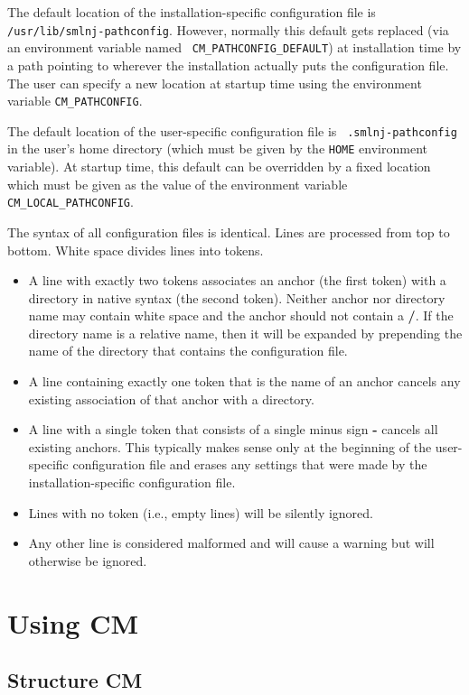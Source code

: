 \documentclass{article}
\begin{document}
The default location of the installation-specific configuration file
is {\tt /usr/lib/smlnj-pathconfig}.  However, normally this default
gets replaced (via an environment variable named {\tt
CM\_PATHCONFIG\_DEFAULT}) at installation time by a path pointing to
wherever the installation actually puts the configuration file.
The user can specify a new location at startup time using the
environment variable {\tt CM\_PATHCONFIG}.

The default location of the user-specific configuration file is {\tt
.smlnj-pathconfig} in the user's home directory (which must be given
by the {\tt HOME} environment variable).  At startup time, this
default can be overridden by a fixed location which must be given as
the value of the environment variable {\tt CM\_LOCAL\_PATHCONFIG}.

The syntax of all configuration files is identical.  Lines are
processed from top to bottom. White space divides lines into tokens.
\begin{itemize}
\item A line with exactly two tokens associates an anchor (the first
token) with a directory in native syntax (the second token).  Neither
anchor nor directory name may contain white space and the anchor
should not contain a {\bf /}.  If the directory name is a relative
name, then it will be expanded by prepending the name of the directory
that contains the configuration file.
\item A line containing exactly one token that is the name of an
anchor cancels any existing association of that anchor with a
directory.
\item A line with a single token that consists of a single minus sign
{\bf -} cancels all existing anchors.  This typically makes sense only
at the beginning of the user-specific configuration file and
erases any settings that were made by the installation-specific
configuration file.
\item Lines with no token (i.e., empty lines) will be silently ignored.
\item Any other line is considered malformed and will cause a warning
but will otherwise be ignored.
\end{itemize}

\section{Using CM}

\subsection{Structure CM}
\label{sec:api}
\end{document}
